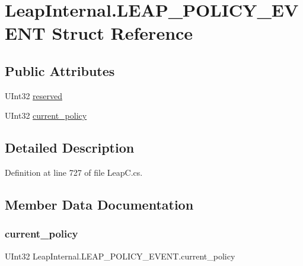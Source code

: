 \hypertarget{struct_leap_internal_1_1_l_e_a_p___p_o_l_i_c_y___e_v_e_n_t}{}\section{Leap\+Internal.\+L\+E\+A\+P\+\_\+\+P\+O\+L\+I\+C\+Y\+\_\+\+E\+V\+E\+NT Struct Reference}
\label{struct_leap_internal_1_1_l_e_a_p___p_o_l_i_c_y___e_v_e_n_t}
\subsection*{Public Attributes}
\begin{DoxyCompactItemize}
\item 
U\+Int32 \mbox{\hyperlink{struct_leap_internal_1_1_l_e_a_p___p_o_l_i_c_y___e_v_e_n_t_a151a24f336684c7f15df18a7120bc803}{reserved}}
\item 
U\+Int32 \mbox{\hyperlink{struct_leap_internal_1_1_l_e_a_p___p_o_l_i_c_y___e_v_e_n_t_ac122fbf3694aefcd53ee998a85794c03}{current\+\_\+policy}}
\end{DoxyCompactItemize}


\subsection{Detailed Description}


Definition at line 727 of file Leap\+C.\+cs.



\subsection{Member Data Documentation}
\mbox{\label{struct_leap_internal_1_1_l_e_a_p___p_o_l_i_c_y___e_v_e_n_t_ac122fbf3694aefcd53ee998a85794c03}} 
\subsubsection{\texorpdfstring{current\_policy}{current\_policy}}
{\footnotesize\ttfamily U\+Int32 Leap\+Internal.\+L\+E\+A\+P\+\_\+\+P\+O\+L\+I\+C\+Y\+\_\+\+E\+V\+E\+N\+T.\+current\+\_\+policy}



